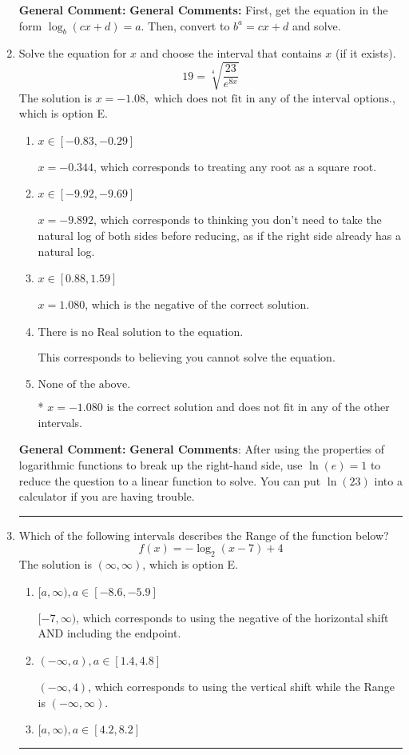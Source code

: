 \documentclass{extbook}[14pt]
\newcommand{\litem}[1]{\item #1

\rule{\textwidth}{0.4pt}}
\begin{document}
\begin{enumerate}
{\textbf{General Comment:} \textbf{General Comments:} First, get the equation in the form $\log_b{(cx+d)} = a$. Then, convert to $b^a = cx+d$ and solve.
}
\litem{
 Solve the equation for $x$ and choose the interval that contains $x$ (if it exists).
\[  19 = \sqrt[4]{\frac{23}{e^{8x}}} \]The solution is \( x = -1.08, \text{ which does not fit in any of the interval options.} \), which is option E.\begin{enumerate}[label=\Alph*.]
\item \( x \in [-0.83, -0.29] \)

$x = -0.344$, which corresponds to treating any root as a square root.
\item \( x \in [-9.92, -9.69] \)

$x = -9.892$, which corresponds to thinking you don't need to take the natural log of both sides before reducing, as if the right side already has a natural log.
\item \( x \in [0.88, 1.59] \)

$x = 1.080$, which is the negative of the correct solution.
\item \( \text{There is no Real solution to the equation.} \)

This corresponds to believing you cannot solve the equation.
\item \( \text{None of the above.} \)

* $x = -1.080$ is the correct solution and does not fit in any of the other intervals.
\end{enumerate}

\textbf{General Comment:} \textbf{General Comments}: After using the properties of logarithmic functions to break up the right-hand side, use $\ln(e) = 1$ to reduce the question to a linear function to solve. You can put $\ln(23)$ into a calculator if you are having trouble.
}
\litem{
Which of the following intervals describes the Range of the function below?
\[ f(x) = -\log_2{(x-7)}+4 \]The solution is \( (\infty, \infty) \), which is option E.\begin{enumerate}[label=\Alph*.]
\item \( [a, \infty), a \in [-8.6, -5.9] \)

$[-7, \infty)$, which corresponds to using the negative of the horizontal shift AND including the endpoint.
\item \( (-\infty, a), a \in [1.4, 4.8] \)

$(-\infty, 4)$, which corresponds to using the vertical shift while the Range is $(-\infty, \infty)$.
\item \( [a, \infty), a \in [4.2, 8.2] \)


\end{enumerate}}
\end{enumerate}
\end{document}
